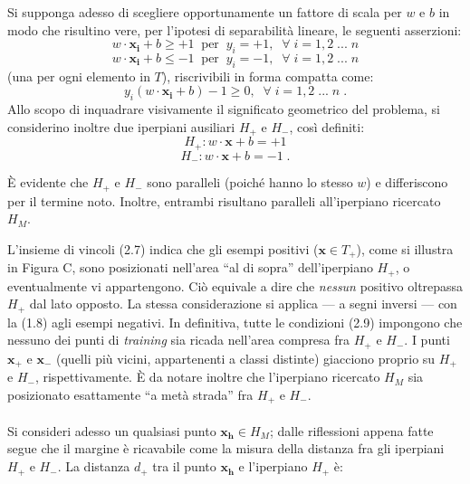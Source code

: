 Si supponga adesso di scegliere opportunamente un fattore di scala per $w$ e $b$ in modo che risultino vere, per l'ipotesi di separabilità lineare, le seguenti asserzioni:
\begin{equation}
	w \cdot \boldsymbol{x_i} + b \geq +1 \;\; \mbox{per} \;\; y_i = +1, \;\; \forall \; i = 1, 2 \;...\; n
\end{equation}
\begin{equation}
	w \cdot \boldsymbol{x_i} + b \leq -1 \;\; \mbox{per} \;\; y_i = -1, \;\; \forall \; i = 1, 2 \;...\; n
\end{equation}
(una per ogni elemento in $T$), riscrivibili in forma compatta come:
\begin{equation}
	y_i(w \cdot \boldsymbol{x_i} + b) -1 \geq 0, \;\; \forall \; i = 1, 2 \;...\; n \;.
\end{equation}
Allo scopo di inquadrare visivamente il significato geometrico del problema, si considerino inoltre due iperpiani ausiliari $H_+$ e $H_-$, così definiti:
\begin{equation}
	H_+: w \cdot \boldsymbol{x} + b = +1
\end{equation}
\begin{equation}
	H_-: w \cdot \boldsymbol{x} + b = -1 \; .
\end{equation}

È evidente che $H_+$ e $H_-$ sono paralleli (poiché hanno lo stesso $w$) e differiscono per il termine noto.
Inoltre, entrambi risultano paralleli all'iperpiano ricercato $H_M$.

L'insieme di vincoli (2.7) indica che gli esempi positivi ($\boldsymbol{x} \in T_+$), come si illustra in Figura C, sono posizionati nell'area ``al di sopra'' dell'iperpiano $H_+$, o eventualmente vi appartengono. Ciò equivale a dire che \textit{nessun} positivo oltrepassa $H_+$ dal lato opposto.
La stessa considerazione si applica --- a segni inversi --- con la (1.8) agli esempi negativi. In definitiva, tutte le condizioni (2.9) impongono che nessuno dei punti di \textit{training} sia ricada nell'area compresa fra $H_+$ e $H_-$.
I punti $\boldsymbol{x_+}$ e $\boldsymbol{x_-}$ (quelli più vicini, appartenenti a classi distinte) giacciono proprio su $H_+$ e $H_-$, rispettivamente. È da notare inoltre che l'iperpiano ricercato $H_M$ sia posizionato esattamente ``a metà strada'' fra $H_+$ e $H_-$.

\paragraph{}
Si consideri adesso un qualsiasi punto $\boldsymbol{x_h} \in H_M$; dalle riflessioni appena fatte segue che il margine è ricavabile come la misura della distanza fra gli iperpiani $H_+$ e $H_-$. La distanza $d_+$ tra il punto $\boldsymbol{x_h}$ e l'iperpiano $H_+$ è:

